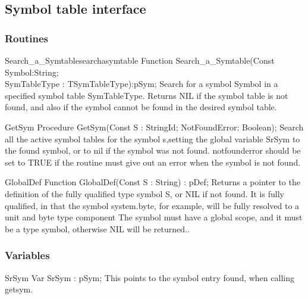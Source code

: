 \documentclass [a4paper,12pt]{article}
\begin{document}
\subsection{Symbol table interface}

\subsubsection{Routines}
\label{subsubsec:routinesable}

\begin{functionl}{Search{\_}a{\_}Symtable}{searchasymtable}
\Declaration
Function Search{\_}a{\_}Symtable(Const Symbol:String; \\
            SymTableType : TSymTableType):pSym;
\Description
Search for a symbol \textsf{Symbol} in a specified symbol table
\textsf{SymTableType}. Returns \textsf{NIL} if the symbol table is not
found, and also if the symbol cannot be found in the desired symbol table.
\end{functionl}

\begin{procedure}{GetSym}
\Declaration
Procedure GetSym(Const S : StringId; NotFoundError: Boolean);
\Description
Search all the active symbol tables for the symbol \textsf{s},setting the
global variable \textsf{SrSym} to the found symbol, or to \textsf{nil} if
the symbol was not found. \textsf{notfounderror} should be set to TRUE if
the routine must give out an error when the symbol is not found.
\end{procedure}

\begin{function}{GlobalDef}
\Declaration
Function GlobalDef(Const S : String) : pDef;
\Description
Returns a pointer to the definition of the fully qualified type symbol
\textsf{S}, or \textsf{NIL} if not found.
\Notes
It is fully qualified, in that the symbol \textsf{system.byte}, for example,
will be fully resolved to a unit and byte type component The symbol must
have a global scope, and it must be a type symbol, otherwise \textsf{NIL}
will be returned..
\end{function}

\subsubsection{Variables}
\label{subsubsec:variablesly}

\begin{variable}{SrSym}
\Declaration
Var SrSym : pSym;
\Description
This points to the symbol entry found, when calling \textsf{getsym}.
\end{variable}
\end{document}
